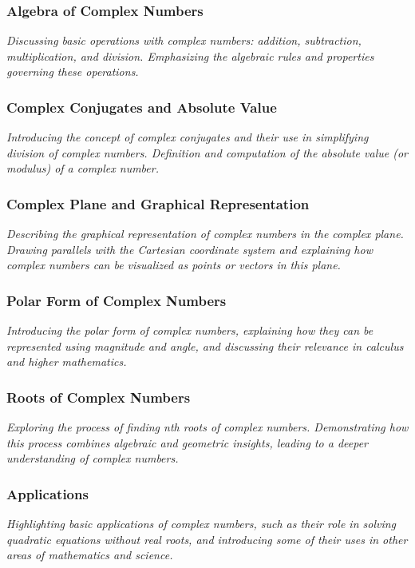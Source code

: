 \documentclass[a4paper,12pt]{book}
\begin{document}
\subsubsection{Algebra of Complex Numbers}
\textit{Discussing basic operations with complex numbers: addition, subtraction, multiplication, and division. Emphasizing the algebraic rules and properties governing these operations.}


\subsubsection{Complex Conjugates and Absolute Value}
\textit{Introducing the concept of complex conjugates and their use in simplifying division of complex numbers. Definition and computation of the absolute value (or modulus) of a complex number.}


\subsubsection{Complex Plane and Graphical Representation}
\textit{Describing the graphical representation of complex numbers in the complex plane. Drawing parallels with the Cartesian coordinate system and explaining how complex numbers can be visualized as points or vectors in this plane.}


\subsubsection{Polar Form of Complex Numbers}
\textit{Introducing the polar form of complex numbers, explaining how they can be represented using magnitude and angle, and discussing their relevance in calculus and higher mathematics.}


\subsubsection{Roots of Complex Numbers}
\textit{Exploring the process of finding nth roots of complex numbers. Demonstrating how this process combines algebraic and geometric insights, leading to a deeper understanding of complex numbers.}


\subsubsection{Applications}
\textit{Highlighting basic applications of complex numbers, such as their role in solving quadratic equations without real roots, and introducing some of their uses in other areas of mathematics and science.}
\end{document}
